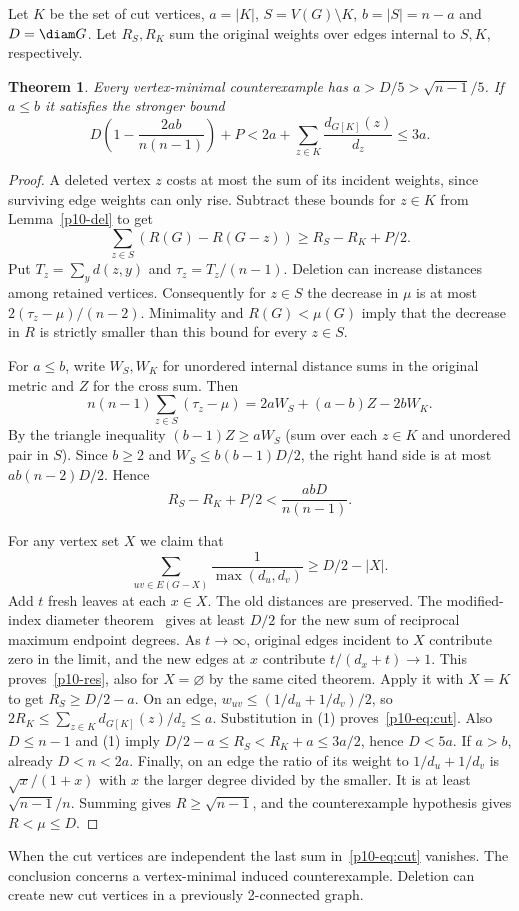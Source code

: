 \documentclass[11pt,a4paper]{article}
\newtheorem{theorem}{Theorem}[section]
\begin{document}
Let $K$ be the set of cut vertices, $a=|K|$, $S=V(G)\setminus K$,
$b=|S|=n-a$ and $D=\diam G$. Let $R_S,R_K$ sum the original weights
over edges internal to $S,K$, respectively.
\begin{theorem}\label{p10-cut}
Every vertex-minimal counterexample has $a>D/5>\sqrt{n-1}/5$.
If $a\le b$ it satisfies the stronger bound
\begin{equation}\label{p10-eq:cut}
 D\left(1-\frac{2ab}{n(n-1)}\right)+P
 < 2a+\sum_{z\in K}\frac{d_{G[K]}(z)}{d_z}\le3a .
\end{equation}
\end{theorem}
\begin{proof}
A deleted vertex $z$ costs at most the sum of its incident weights,
since surviving edge weights can only rise. Subtract these bounds for
$z\in K$ from Lemma~\ref{p10-del} to get
\[
 \sum_{z\in S}(R(G)-R(G-z))\ge R_S-R_K+P/2 .
\]
Put $T_z=\sum_y d(z,y)$ and $\tau_z=T_z/(n-1)$.
Deletion can increase distances among retained vertices. Consequently
for $z\in S$ the decrease in $\mu$ is at most
$2(\tau_z-\mu)/(n-2)$. Minimality and $R(G)<\mu(G)$ imply that the
decrease in $R$ is strictly smaller than this bound for every $z\in S$.

For $a\le b$, write $W_S,W_K$ for unordered internal distance sums in
the original metric and $Z$ for the cross sum. Then
\[
 n(n-1)\sum_{z\in S}(\tau_z-\mu)=2aW_S+(a-b)Z-2bW_K .
\]
By the triangle inequality $(b-1)Z\ge aW_S$ (sum over each $z\in K$
and unordered pair in $S$). Since $b\ge2$ and $W_S\le b(b-1)D/2$,
the right hand side is at most $ab(n-2)D/2$. Hence
\[
 R_S-R_K+P/2<\frac{abD}{n(n-1)}. \tag{1}
\]

For any vertex set $X$ we claim that
\begin{equation}\label{p10-res}
 \sum_{uv\in E(G-X)}\frac1{\max(d_u,d_v)}\ge D/2-|X|.
\end{equation}
Add $t$ fresh leaves at each $x\in X$. The old distances are preserved.
The modified-index diameter theorem~\cite[Theorem 3]{p10-DLS} gives at least
$D/2$ for the new sum of reciprocal maximum endpoint degrees.
As $t\to\infty$, original edges incident to $X$ contribute zero in the
limit, and the new edges at $x$ contribute $t/(d_x+t)\to1$.
This proves~\eqref{p10-res}, also for $X=\varnothing$ by the same cited theorem.
Apply it with $X=K$ to get $R_S\ge D/2-a$. On an edge,
$w_{uv}\le(1/d_u+1/d_v)/2$, so
$2R_K\le\sum_{z\in K}d_{G[K]}(z)/d_z\le a$.
Substitution in (1) proves~\eqref{p10-eq:cut}. Also $D\le n-1$ and (1) imply
$D/2-a\le R_S<R_K+a\le3a/2$, hence $D<5a$. If $a>b$, already $D<n<2a$.
Finally, on an edge the ratio of its weight to $1/d_u+1/d_v$ is
$\sqrt{x}/(1+x)$ with $x$ the larger degree divided by the smaller.
It is at least $\sqrt{n-1}/n$. Summing gives $R\ge\sqrt{n-1}$, and
the counterexample hypothesis gives $R<\mu\le D$.
\end{proof}
When the cut vertices are independent the last sum in~\eqref{p10-eq:cut}
vanishes. The conclusion concerns a vertex-minimal induced counterexample.
Deletion can create new cut vertices in a previously 2-connected graph.
\end{document}
